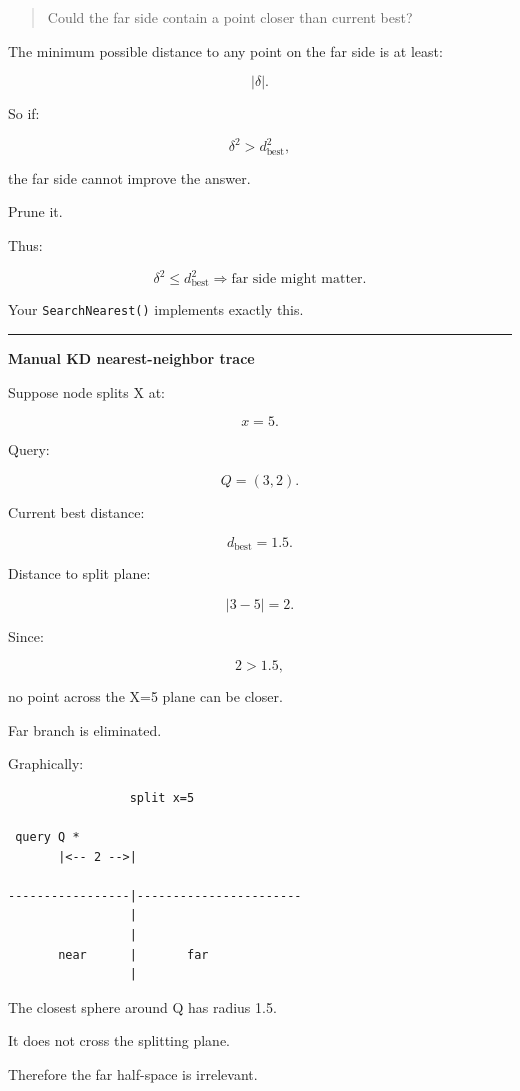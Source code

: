 \begin{quote}
Could the far side contain a point closer than current best?
\end{quote}

The minimum possible distance to any point on the far side is at least:

\[
|\delta|.
\]

So if:

\[
\delta^2>d^2_{\text{best}},
\]

the far side cannot improve the answer.

Prune it.

Thus:

\[
\boxed{
\delta^2
\le
d^2_{\text{best}}
\Rightarrow
\text{far side might matter}.
}
\]

Your \texttt{SearchNearest()} implements exactly this.

\begin{center}\rule{0.5\linewidth}{0.5pt}\end{center}

\textbf{Manual KD nearest-neighbor trace}

Suppose node splits X at:

\[
x=5.
\]

Query:

\[
Q=(3,2).
\]

Current best distance:

\[
d_{\text{best}}=1.5.
\]

Distance to split plane:

\[
|3-5|=2.
\]

Since:

\[
2>1.5,
\]

no point across the X=5 plane can be closer.

Far branch is eliminated.

Graphically:

\begin{verbatim}
                 split x=5

 query Q *
       |<-- 2 -->|

-----------------|-----------------------
                 |
                 |
       near      |       far
                 |
\end{verbatim}

The closest sphere around Q has radius 1.5.

It does not cross the splitting plane.

Therefore the far half-space is irrelevant.


